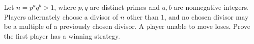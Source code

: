 Let $n=p^aq^b>1$, where $p,q$ are distinct primes and $a,b$ are nonnegative integers. Players alternately choose a divisor of $n$ other than $1$, and no chosen divisor may be a multiple of a previously chosen divisor. A player unable to move loses. Prove the first player has a winning strategy.
